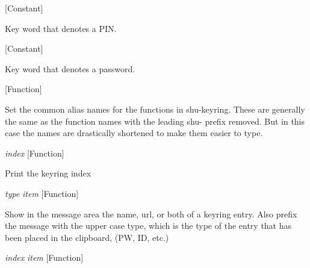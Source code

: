 \vspace{1em}
\noindent
{}
\usebox{\funcname}
 \hfill [Constant]

\begin{doc-string}
Key word that denotes a PIN.
\end{doc-string}

\vspace{1em}
\noindent
{}
\usebox{\funcname}
 \hfill [Constant]

\begin{doc-string}
Key word that denotes a password.
\end{doc-string}

\vspace{1em}
\noindent
{}
\usebox{\funcname}
 \hfill [Function]

\begin{doc-string}
Set the common alias names for the functions in shu-keyring.
These are generally the same as the function names with the leading
shu- prefix removed.  But in this case the names are drastically shortened
to make them easier to type.
\end{doc-string}

\vspace{1em}
\noindent
{}
\usebox{\funcname}\emph{index}
 \hfill [Function]

\begin{doc-string}
Print the keyring index
\end{doc-string}

\vspace{1em}
\noindent
{}
\usebox{\funcname}\emph{type} \emph{item}
 \hfill [Function]

\begin{doc-string}
Show in the message area the name, url, or both of a keyring entry.  Also prefix
the message with the upper case type, which is the type of the entry that has been
placed in the clipboard, (PW, ID, etc.)
\end{doc-string}

\vspace{1em}
\noindent
{}
\usebox{\funcname}\emph{index} \emph{item}
 \hfill [Function]

